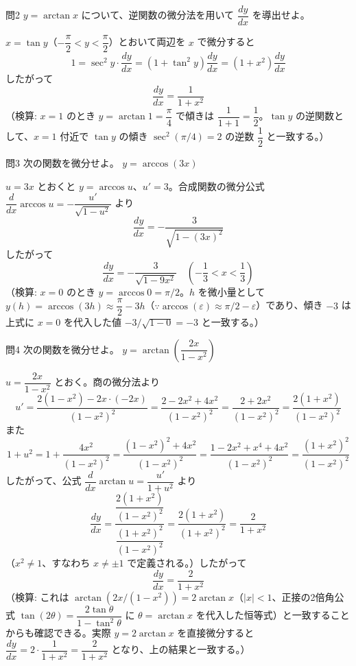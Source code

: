 \documentclass[a4paper,11pt]{article}
\begin{document}
\clearpage
\begin{mondaiboxS}{問2}
$y = \arctan x$ について、逆関数の微分法を用いて $\dfrac{dy}{dx}$ を導出せよ。
\end{mondaiboxS}
\kaitou
$x = \tan y$（$-\dfrac{\pi}{2} < y < \dfrac{\pi}{2}$）とおいて両辺を $x$ で微分すると
\[
1 = \sec^{2} y \cdot \frac{dy}{dx} = (1+\tan^{2}y)\frac{dy}{dx} = (1+x^{2})\frac{dy}{dx}
\]
したがって
\[
\boxed{\; \frac{dy}{dx} = \frac{1}{1+x^{2}} \;}
\]
（検算: $x=1$ のとき $y = \arctan 1 = \dfrac{\pi}{4}$ で傾きは $\dfrac{1}{1+1}=\dfrac{1}{2}$。$\tan y$ の逆関数として、$x=1$ 付近で $\tan y$ の傾き $\sec^{2}(\pi/4)=2$ の逆数 $\dfrac12$ と一致する。）

\clearpage
\begin{mondaiboxS}{問3}
次の関数を微分せよ。 $y = \arccos(3x)$
\end{mondaiboxS}
\kaitou
$u = 3x$ とおくと $y = \arccos u$、$u' = 3$。合成関数の微分公式 $\dfrac{d}{dx}\arccos u = -\dfrac{u'}{\sqrt{1-u^{2}}}$ より
\[
\frac{dy}{dx} = -\frac{3}{\sqrt{1-(3x)^{2}}}
\]
したがって
\[
\boxed{\; \frac{dy}{dx} = -\frac{3}{\sqrt{1-9x^{2}}} \quad \left(-\frac{1}{3} < x < \frac{1}{3}\right) \;}
\]
（検算: $x=0$ のとき $y=\arccos 0 = \pi/2$。$h$ を微小量として $y(h) = \arccos(3h) \approx \dfrac{\pi}{2} - 3h$（$\because \arccos(\varepsilon)\approx \pi/2-\varepsilon$）であり、傾き $-3$ は上式に $x=0$ を代入した値 $-3/\sqrt{1-0}=-3$ と一致する。）

\clearpage
\begin{mondaiboxS}{問4}
次の関数を微分せよ。 $y = \arctan\!\left(\dfrac{2x}{1-x^{2}}\right)$
\end{mondaiboxS}
\kaitou
$u = \dfrac{2x}{1-x^{2}}$ とおく。商の微分法より
\[
u' = \frac{2(1-x^{2}) - 2x\cdot(-2x)}{(1-x^{2})^{2}}
= \frac{2 - 2x^{2} + 4x^{2}}{(1-x^{2})^{2}}
= \frac{2 + 2x^{2}}{(1-x^{2})^{2}}
= \frac{2(1+x^{2})}{(1-x^{2})^{2}}
\]
また
\[
1 + u^{2} = 1 + \frac{4x^{2}}{(1-x^{2})^{2}}
= \frac{(1-x^{2})^{2} + 4x^{2}}{(1-x^{2})^{2}}
= \frac{1 - 2x^{2} + x^{4} + 4x^{2}}{(1-x^{2})^{2}}
= \frac{(1+x^{2})^{2}}{(1-x^{2})^{2}}
\]
したがって、公式 $\dfrac{d}{dx}\arctan u = \dfrac{u'}{1+u^{2}}$ より
\[
\frac{dy}{dx} = \frac{\dfrac{2(1+x^{2})}{(1-x^{2})^{2}}}{\dfrac{(1+x^{2})^{2}}{(1-x^{2})^{2}}}
= \frac{2(1+x^{2})}{(1+x^{2})^{2}}
= \frac{2}{1+x^{2}}
\]
（$x^{2} \neq 1$、すなわち $x \neq \pm 1$ で定義される。）したがって
\[
\boxed{\; \frac{dy}{dx} = \frac{2}{1+x^{2}} \;}
\]
（検算: これは $\arctan(2x/(1-x^{2})) = 2\arctan x$（$|x|<1$、正接の2倍角公式 $\tan(2\theta) = \dfrac{2\tan\theta}{1-\tan^{2}\theta}$ に $\theta=\arctan x$ を代入した恒等式）と一致することからも確認できる。実際 $y=2\arctan x$ を直接微分すると $\dfrac{dy}{dx} = 2\cdot\dfrac{1}{1+x^{2}} = \dfrac{2}{1+x^{2}}$ となり、上の結果と一致する。）
\end{document}
